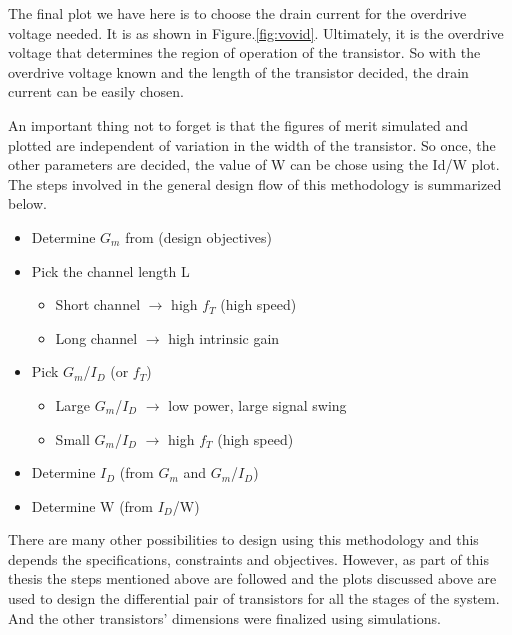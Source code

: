 The final plot we have here is to choose the drain current for the overdrive voltage needed. It is as shown in Figure.\ref{fig:vovid}. Ultimately, it is the overdrive voltage that determines the region of operation of the transistor. So with the overdrive voltage known and the length of the transistor decided, the drain current can be easily chosen.

An important thing not to forget is that the figures of merit simulated and plotted are independent of variation in the width of the transistor. So once, the other parameters are decided, the value of W can be chose using the Id/W plot. The steps involved in the general design flow of this methodology is summarized below.
\begin{itemize}
\item Determine $G_m$ from (design objectives)
\item Pick the channel length L
	\begin{itemize}
	\item Short channel $\rightarrow$ high $f_T$ (high speed)
	\item Long channel $\rightarrow$ high intrinsic gain
	\end{itemize}
\item Pick $G_m$/$I_D$ (or $f_T$)
	\begin{itemize}
	\item Large $G_m$/$I_D$ $\rightarrow$ low power, large signal swing
	\item Small $G_m$/$I_D$ $\rightarrow$ high $f_T$ (high speed)
	\end{itemize}
\item Determine $I_D$ (from $G_m$ and $G_m$/$I_D$)
\item Determine W (from $I_D$/W)
\end{itemize}

There are many other possibilities to design using this methodology and this depends the specifications, constraints and objectives. However, as part of this thesis the steps mentioned above are followed and the plots discussed above are used to design the differential pair of transistors for all the stages of the system. And the other transistors' dimensions were finalized using simulations.
